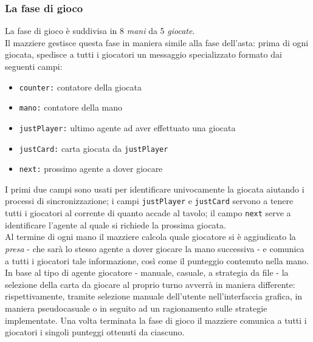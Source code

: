 \documentclass[runningheads,a4paper]{llncs}
\begin{document}
\subsubsection{La fase di gioco}
La fase di gioco è suddivisa in 8 \emph{mani} da 5 \emph{giocate}.\\
Il mazziere gestisce questa fase in maniera simile alla fase dell'asta: prima di ogni giocata, spedisce a tutti i giocatori un messaggio specializzato formato dai seguenti campi:
\begin{itemize}
   \item \texttt{counter:} contatore della giocata
   \item \texttt{mano:} contatore della mano
   \item \texttt{justPlayer:} ultimo agente ad aver effettuato una giocata
   \item \texttt{justCard:}   carta giocata da \texttt{justPlayer}
   \item \texttt{next:}   prossimo agente a dover giocare
\end{itemize}
I primi due campi sono usati per identificare univocamente la giocata aiutando i processi di sincronizzazione; i campi \texttt{justPlayer} e \texttt{justCard} servono a tenere tutti i giocatori al corrente di quanto accade al tavolo; il campo \texttt{next} serve a identificare l'agente al quale si richiede la prossima giocata.\\
Al termine di ogni mano il mazziere calcola quale giocatore si è aggiudicato la \emph{presa} - che sarà lo stesso agente a dover giocare la mano successiva - e comunica a tutti i giocatori tale informazione, così come il punteggio contenuto nella mano.\\
In base al tipo di agente giocatore - manuale, casuale, a strategia da file - la selezione della carta da giocare al proprio turno avverrà in maniera differente: rispettivamente, tramite selezione manuale dell'utente nell'interfaccia grafica, in maniera pseudocasuale o in seguito ad un ragionamento sulle strategie implementate.
Una volta terminata la fase di gioco il mazziere comunica a tutti i giocatori i singoli punteggi ottenuti da ciascuno.
\end{document}
